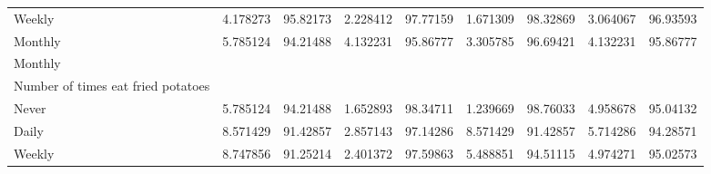 \documentclass{article}
\begin{document}
\begin{tabular}{lllllllll}
\multicolumn{1}{l}{\hspace{7em}Weekly} &
  \multicolumn{1}{|r}{4.178273} &
  \multicolumn{1}{r}{95.82173} &
  \multicolumn{1}{r}{2.228412} &
  \multicolumn{1}{r}{97.77159} &
  \multicolumn{1}{r}{1.671309} &
  \multicolumn{1}{r}{98.32869} &
  \multicolumn{1}{r}{3.064067} &
  \multicolumn{1}{r}{96.93593} \\
\multicolumn{1}{l}{\hspace{7em}Monthly} &
  \multicolumn{1}{|r}{5.785124} &
  \multicolumn{1}{r}{94.21488} &
  \multicolumn{1}{r}{4.132231} &
  \multicolumn{1}{r}{95.86777} &
  \multicolumn{1}{r}{3.305785} &
  \multicolumn{1}{r}{96.69421} &
  \multicolumn{1}{r}{4.132231} &
  \multicolumn{1}{r}{95.86777} \\
\multicolumn{1}{l}{\hspace{5em}Monthly} &
  \multicolumn{1}{|r}{} &
  \multicolumn{1}{r}{} &
  \multicolumn{1}{r}{} &
  \multicolumn{1}{r}{} &
  \multicolumn{1}{r}{} &
  \multicolumn{1}{r}{} &
  \multicolumn{1}{r}{} &
  \multicolumn{1}{r}{} \\
\multicolumn{1}{l}{\hspace{6em}Number of times eat fried potatoes} &
  \multicolumn{1}{|r}{} &
  \multicolumn{1}{r}{} &
  \multicolumn{1}{r}{} &
  \multicolumn{1}{r}{} &
  \multicolumn{1}{r}{} &
  \multicolumn{1}{r}{} &
  \multicolumn{1}{r}{} &
  \multicolumn{1}{r}{} \\
\multicolumn{1}{l}{\hspace{7em}Never} &
  \multicolumn{1}{|r}{5.785124} &
  \multicolumn{1}{r}{94.21488} &
  \multicolumn{1}{r}{1.652893} &
  \multicolumn{1}{r}{98.34711} &
  \multicolumn{1}{r}{1.239669} &
  \multicolumn{1}{r}{98.76033} &
  \multicolumn{1}{r}{4.958678} &
  \multicolumn{1}{r}{95.04132} \\
\multicolumn{1}{l}{\hspace{7em}Daily} &
  \multicolumn{1}{|r}{8.571429} &
  \multicolumn{1}{r}{91.42857} &
  \multicolumn{1}{r}{2.857143} &
  \multicolumn{1}{r}{97.14286} &
  \multicolumn{1}{r}{8.571429} &
  \multicolumn{1}{r}{91.42857} &
  \multicolumn{1}{r}{5.714286} &
  \multicolumn{1}{r}{94.28571} \\
\multicolumn{1}{l}{\hspace{7em}Weekly} &
  \multicolumn{1}{|r}{8.747856} &
  \multicolumn{1}{r}{91.25214} &
  \multicolumn{1}{r}{2.401372} &
  \multicolumn{1}{r}{97.59863} &
  \multicolumn{1}{r}{5.488851} &
  \multicolumn{1}{r}{94.51115} &
  \multicolumn{1}{r}{4.974271} &
  \multicolumn{1}{r}{95.02573} \\

\end{tabular}
\end{document}
